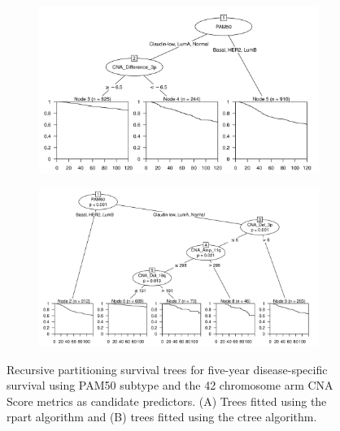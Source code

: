 \begin{figure}[!h]
\centering

\vspace{0.5cm}

\begin{subfigure}{\textwidth}
\subcaption{}
\includegraphics[width=1\textwidth]{../figures/Chapter_3/PA_PartyKit_Survival_Score_TenYearDSS_PAM50.png}
\end{subfigure}

\vspace{2cm}

\begin{subfigure}{\textwidth}
\subcaption{}
\includegraphics[width=1\textwidth]{../figures/Chapter_3/PA_Ctree_Survival_Score_TenYearDSS_PAM50.png}
\end{subfigure}

\vspace{0.5cm}

\caption[Recursive partitioning survival trees for five-year disease-specific survival using PAM50 subtype and the 42 chromosome arm CNA Score metrics as candidate predictors.]{Recursive partitioning survival trees for five-year disease-specific survival using PAM50 subtype and the 42 chromosome arm CNA Score metrics as candidate predictors. (A) Trees fitted using the rpart algorithm and (B) trees fitted using the ctree algorithm.}
\label{fig:PAM50_PA_CNA_Score_TenYearDSS}
\end{figure}

